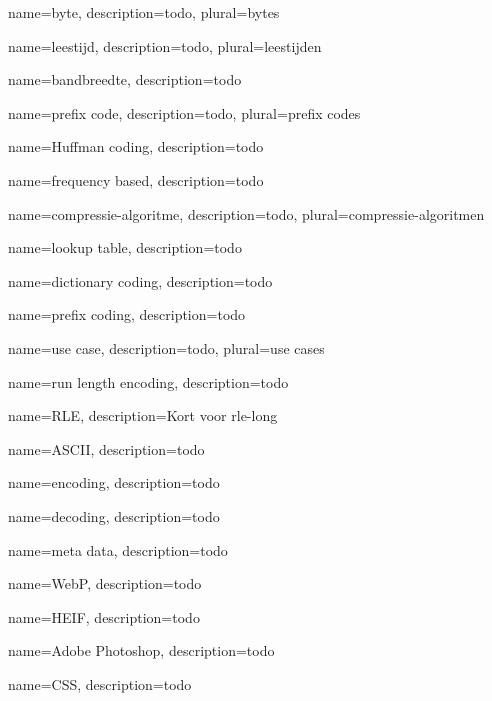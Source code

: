 {
	name={byte},
	description={todo},
	plural={bytes}
}

{
	name={leestijd},
	description={todo},
	plural={leestijden}
}

{
	name={bandbreedte},
	description={todo}
}

{
	name={prefix code},
	description={todo},
	plural={prefix codes}
}

{
	name={Huffman coding},
	description={todo}
}

{
	name={frequency based},
	description={todo}
}

{
	name={compressie-algoritme},
	description={todo},
	plural={compressie-algoritmen}
}

{
	name={lookup table},
	description={todo}
}

{
	name={dictionary coding},
	description={todo}
}

{
	name={prefix coding},
	description={todo}
}

{
	name={use case},
	description={todo},
	plural={use cases}
}

{
	name={run length encoding},
	description={todo}
}

{
	name={RLE},
	description={Kort voor \gls{rle-long}}
}

{
	name={ASCII},
	description={todo}
}

{
	name={encoding},
	description={todo}
}

{
	name={decoding},
	description={todo}
}

{
	name={meta data},
	description={todo}
}

{
	name={WebP},
	description={todo}
}

{
	name={HEIF},
	description={todo}
}

{
	name={Adobe Photoshop},
	description={todo}
}

{
	name={CSS},
	description={todo}
}

